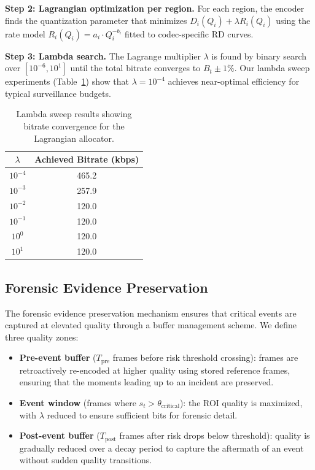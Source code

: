 \textbf{Step 2: Lagrangian optimization per region.} For each region, the encoder finds the quantization parameter that minimizes $D_i(Q_i) + \lambda R_i(Q_i)$ using the rate model $R_i(Q_i) = a_i \cdot Q_i^{-b_i}$ fitted to codec-specific RD curves.

\textbf{Step 3: Lambda search.} The Lagrange multiplier $\lambda$ is found by binary search over $[10^{-6}, 10^{1}]$ until the total bitrate converges to $B_t \pm 1\%$. Our lambda sweep experiments (Table~\ref{tab:lambda_sweep}) show that $\lambda = 10^{-4}$ achieves near-optimal efficiency for typical surveillance budgets.

\begin{table}[t]
\centering
\caption{Lambda sweep results showing bitrate convergence for the Lagrangian allocator.}
\label{tab:lambda_sweep}
\begin{tabular}{cc}
\toprule
$\lambda$ & Achieved Bitrate (kbps) \\
\midrule
$10^{-4}$ & 465.2 \\
$10^{-3}$ & 257.9 \\
$10^{-2}$ & 120.0 \\
$10^{-1}$ & 120.0 \\
$10^{0}$  & 120.0 \\
$10^{1}$  & 120.0 \\
\bottomrule
\end{tabular}
\end{table}

\subsection{Forensic Evidence Preservation}
\label{sec:forensic}

The forensic evidence preservation mechanism ensures that critical events are captured at elevated quality through a buffer management scheme. We define three quality zones:

\begin{itemize}
    \item \textbf{Pre-event buffer} ($T_{\text{pre}}$ frames before risk threshold crossing): frames are retroactively re-encoded at higher quality using stored reference frames, ensuring that the moments leading up to an incident are preserved.
    \item \textbf{Event window} (frames where $s_t > \theta_{\text{critical}}$): the ROI quality is maximized, with $\lambda$ reduced to ensure sufficient bits for forensic detail.
    \item \textbf{Post-event buffer} ($T_{\text{post}}$ frames after risk drops below threshold): quality is gradually reduced over a decay period to capture the aftermath of an event without sudden quality transitions.
\end{itemize}

